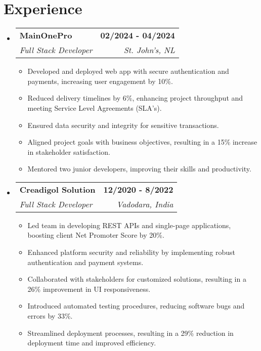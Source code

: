 \documentclass[letterpaper,11pt]{article}
\makeatletter
\newcommand{\resumeItem}[1]{
  \item\small{
    {#1 \vspace{-2pt}}
  }
}
\newcommand{\resumeSubheading}[4]{
  \vspace{-2pt}\item
    \begin{tabular*}{1.0\textwidth}[t]{l@{\extracolsep{\fill}}r}
      \textbf{#1} & \textbf{\small #2} \\
      \textit{\small#3} & \textit{\small #4} \\
    \end{tabular*}\vspace{-7pt}
}
\newcommand{\resumeSubHeadingListStart}{\begin{itemize}[leftmargin=0.0in, label={}]}
\newcommand{\resumeSubHeadingListEnd}{\end{itemize}}
\newcommand{\resumeItemListStart}{\begin{itemize}}
\newcommand{\resumeItemListEnd}{\end{itemize}\vspace{-5pt}}
\makeatother
\begin{document}
\section{Experience}
  \resumeSubHeadingListStart
    \resumeSubheading
      {MainOnePro}{02/2024 - 04/2024}
      {Full Stack Developer}{St. John's, NL}
      \resumeItemListStart
        \resumeItem{Developed and deployed web app with secure authentication and payments, increasing user engagement by 10\%.}
        \resumeItem{Reduced delivery timelines by 6\%, enhancing project throughput and meeting Service Level Agreements (SLA’s).}
        \resumeItem{Ensured data security and integrity for sensitive transactions.}
        \resumeItem{Aligned project goals with business objectives, resulting in a 15\% increase in stakeholder satisfaction.}
        \resumeItem{Mentored two junior developers, improving their skills and productivity.}
      \resumeItemListEnd
    \resumeSubheading
      {Creadigol Solution}{12/2020 - 8/2022}
      {Full Stack Developer}{Vadodara, India}
      \resumeItemListStart
        \resumeItem{Led team in developing REST APIs and single-page applications, boosting client Net Promoter Score by 20\%.}
        \resumeItem{Enhanced platform security and reliability by implementing robust authentication and payment systems.}
        \resumeItem{Collaborated with stakeholders for customized solutions, resulting in a 26\% improvement in UI responsiveness.}
        \resumeItem{Introduced automated testing procedures, reducing software bugs and errors by 33\%.}
        \resumeItem{Streamlined deployment processes, resulting in a 29\% reduction in deployment time and improved efficiency.}
      \resumeItemListEnd
  \resumeSubHeadingListEnd
\vspace{-16pt}
\end{document}

